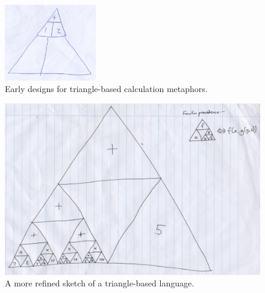 \documentclass[12pt,twoside,notitlepage,xetex]{report}
\begin{document}
\begin{center}
\begin{figure}[H]
\begin{center}
{{\begin{center}
\includegraphics[width=4cm]{figs/mockups/sketches/42/42a.jpg}
\end{center}}}
\end{center}
\caption{Early designs for triangle-based calculation metaphors.}
\label{fig:Tris1}
\end{figure}
\end{center}

\begin{center}
\begin{figure}
\begin{center}
\includegraphics[width=\textwidth]{figs/mockups/sketches/31/31a.jpg}
\end{center}
\caption{A more refined sketch of a triangle-based language.}
\label{fig:Tris2}
\end{figure}
\end{center}
\end{document}
